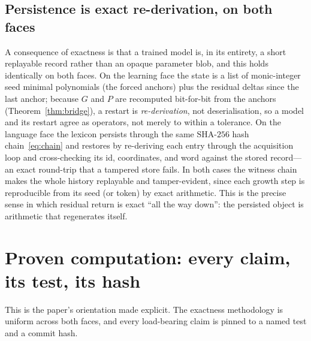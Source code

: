 \documentclass[11pt]{article}
\theoremstyle{plain}
\theoremstyle{definition}
\theoremstyle{remark}
\newcommand{\GG}{G}
\begin{document}
\subsection{Persistence is exact re-derivation, on both faces}\label{subsec:persist}
A consequence of exactness is that a trained model is, in its entirety, a short replayable record rather than
an opaque parameter blob, and this holds identically on both faces. On the learning face the state is a list
of monic-integer seed minimal polynomials (the forced anchors) plus the residual deltas since the last anchor;
because $\GG$ and $P$ are recomputed bit-for-bit from the anchors (Theorem~\ref{thm:bridge}), a restart is
\emph{re-derivation}, not deserialisation, so a model and its restart agree as operators, not merely to within
a tolerance. On the language face the lexicon persists through the same $\mathrm{SHA}\text{-}256$ hash
chain~\eqref{eq:chain} and restores by re-deriving each entry through the acquisition loop and cross-checking
its id, coordinates, and word against the stored record---an exact round-trip that a tampered store fails. In
both cases the witness chain makes the whole history replayable and tamper-evident, since each growth step is
reproducible from its seed (or token) by exact arithmetic. This is the precise sense in which residual return
is exact ``all the way down'': the persisted object is arithmetic that regenerates itself.

\section{Proven computation: every claim, its test, its hash}\label{sec:proven}

This is the paper's orientation made explicit. The exactness methodology is uniform across both faces, and
every load-bearing claim is pinned to a named test and a commit hash.
\end{document}
